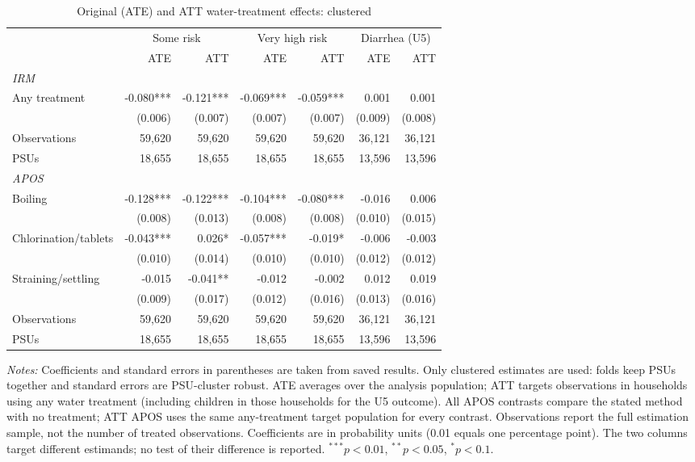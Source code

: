 \begin{table}[htbp]
\centering
\caption{Original (ATE) and ATT water-treatment effects: clustered}
\label{tab:table-ate-att-main}
\scriptsize
\begin{adjustbox}{max width=\linewidth}
\begin{tabular}{lrrrrrr}
\toprule
 & \multicolumn{2}{c}{Some risk} & \multicolumn{2}{c}{Very high risk} & \multicolumn{2}{c}{Diarrhea (U5)} \\
 & ATE & ATT & ATE & ATT & ATE & ATT \\
\midrule
\multicolumn{7}{l}{\textit{IRM}} \\
Any treatment & -0.080*** & -0.121*** & -0.069*** & -0.059*** & 0.001 & 0.001 \\
 & (0.006) & (0.007) & (0.007) & (0.007) & (0.009) & (0.008) \\
Observations & 59,620 & 59,620 & 59,620 & 59,620 & 36,121 & 36,121 \\
PSUs & 18,655 & 18,655 & 18,655 & 18,655 & 13,596 & 13,596 \\
\midrule
\multicolumn{7}{l}{\textit{APOS}} \\
Boiling & -0.128*** & -0.122*** & -0.104*** & -0.080*** & -0.016 & 0.006 \\
 & (0.008) & (0.013) & (0.008) & (0.008) & (0.010) & (0.015) \\
Chlorination/tablets & -0.043*** & 0.026* & -0.057*** & -0.019* & -0.006 & -0.003 \\
 & (0.010) & (0.014) & (0.010) & (0.010) & (0.012) & (0.012) \\
Straining/settling & -0.015 & -0.041** & -0.012 & -0.002 & 0.012 & 0.019 \\
 & (0.009) & (0.017) & (0.012) & (0.016) & (0.013) & (0.016) \\
Observations & 59,620 & 59,620 & 59,620 & 59,620 & 36,121 & 36,121 \\
PSUs & 18,655 & 18,655 & 18,655 & 18,655 & 13,596 & 13,596 \\
\bottomrule
\end{tabular}
\end{adjustbox}
\par\vspace{3pt}
\begin{minipage}{\linewidth}\scriptsize \textit{Notes:} Coefficients and standard errors in parentheses are taken from saved results. Only clustered estimates are used: folds keep PSUs together and standard errors are PSU-cluster robust. ATE averages over the analysis population; ATT targets observations in households using any water treatment (including children in those households for the U5 outcome). All APOS contrasts compare the stated method with no treatment; ATT APOS uses the same any-treatment target population for every contrast. Observations report the full estimation sample, not the number of treated observations. Coefficients are in probability units (0.01 equals one percentage point). The two columns target different estimands; no test of their difference is reported. $^{***}p<0.01$, $^{**}p<0.05$, $^{*}p<0.1$. \end{minipage}
\end{table}
